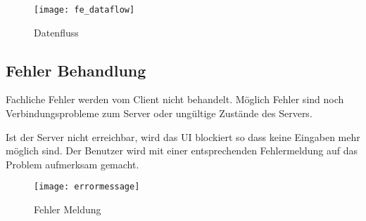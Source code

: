 \begin{figure}[H]
    \texttt{[image: fe\_dataflow]}
    \caption{Datenfluss}
\end{figure}

\subsection{Fehler Behandlung}
Fachliche Fehler werden vom Client nicht behandelt.
Möglich Fehler sind noch Verbindungsprobleme zum Server oder ungültige Zustände des Servers.

Ist der Server nicht erreichbar, wird das UI blockiert so dass keine Eingaben mehr möglich sind.
Der Benutzer wird mit einer entsprechenden Fehlermeldung auf das Problem aufmerksam gemacht.

\begin{figure}[H]
    \centering
    \texttt{[image: errormessage]}
    \caption{Fehler Meldung}
\end{figure}